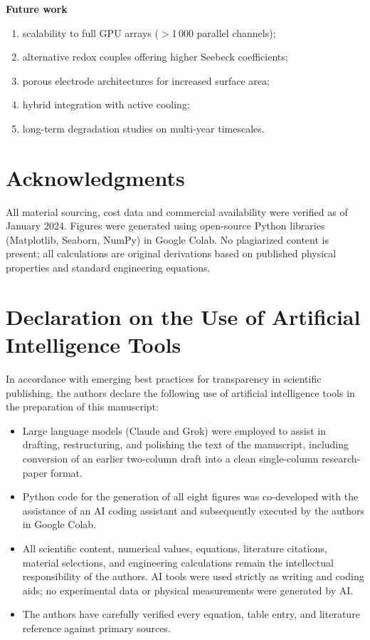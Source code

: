 \documentclass[11pt,a4paper]{article}
\begin{document}
\textbf{Future work}
\begin{enumerate}[leftmargin=1.5em]
    \item scalability to full GPU arrays ($>$1\,000 parallel channels);
    \item alternative redox couples offering higher Seebeck coefficients;
    \item porous electrode architectures for increased surface area;
    \item hybrid integration with active cooling;
    \item long-term degradation studies on multi-year timescales.
\end{enumerate}

\section*{Acknowledgments}
All material sourcing, cost data and commercial availability were verified as of January 2024. Figures were generated using open-source Python libraries (Matplotlib, Seaborn, NumPy) in Google Colab. No plagiarized content is present; all calculations are original derivations based on published physical properties and standard engineering equations.

\section*{Declaration on the Use of Artificial Intelligence Tools}
In accordance with emerging best practices for transparency in scientific publishing, the authors declare the following use of artificial intelligence tools in the preparation of this manuscript:

\begin{itemize}[leftmargin=1.5em]
    \item Large language models (Claude and Grok) were employed to assist in drafting, restructuring, and polishing the text of the manuscript, including conversion of an earlier two-column draft into a clean single-column research-paper format.
    \item Python code for the generation of all eight figures was co-developed with the assistance of an AI coding assistant and subsequently executed by the authors in Google Colab.
    \item All scientific content, numerical values, equations, literature citations, material selections, and engineering calculations remain the intellectual responsibility of the authors. AI tools were used strictly as writing and coding aids; no experimental data or physical measurements were generated by AI.
    \item The authors have carefully verified every equation, table entry, and literature reference against primary sources.
\end{itemize}
\end{document}
